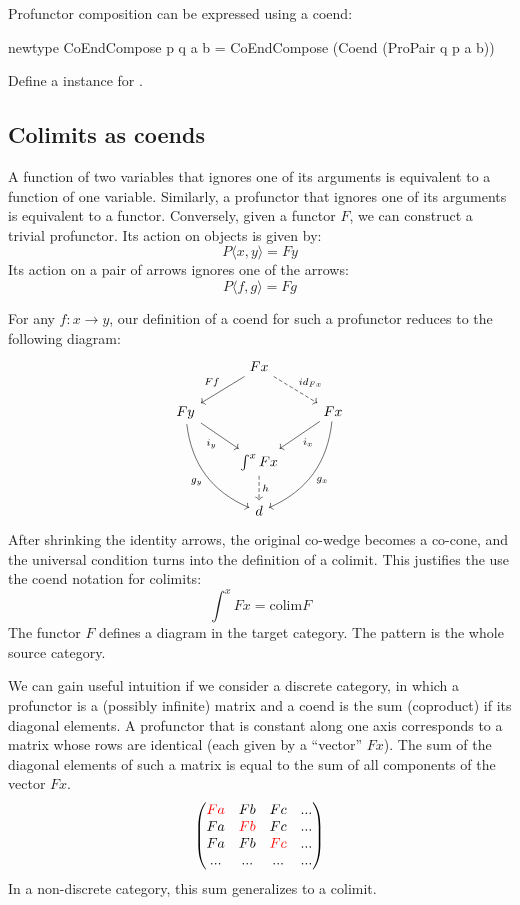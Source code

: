 \documentclass[DaoFP]{subfiles}
\begin{document}
\begin{exercise}
Profunctor composition can be expressed using a coend:
\begin{haskell}
newtype CoEndCompose p q a b = CoEndCompose (Coend (ProPair q p a b))
\end{haskell}
Define a  instance for .
\end{exercise}

\subsection{Colimits as coends}
A function of two variables that ignores one of its arguments is equivalent to a function of one variable. Similarly, a profunctor that ignores one of its arguments is equivalent to a functor. Conversely, given a functor $F$, we can construct a trivial profunctor. Its action on objects is given by:
\[P \langle x, y \rangle = F y \]
Its action on a pair of arrows ignores one of the arrows:
\[P \langle f, g \rangle = F g \]

For any   $f \colon x \to y$, our definition of a coend for such a profunctor reduces to the following diagram:
\[
 \begin{tikzcd}
 & F x
 \arrow[ld, "F f"']
 \arrow[rd, dashed, "id_{F x}"]
 \\
 F y
 \arrow[dr, "i_y"']
 \arrow[ddr, bend right,  "g_y"']
 && F x
 \arrow[dl, "i_x"]
 \arrow[ddl, bend left,  "g_x"]
 \\
 &\int^x F x
 \arrow[d, dashed, "h"]
 \\
 &d
 \end{tikzcd}
\]
After shrinking the identity arrows, the original co-wedge becomes a co-cone, and the universal condition turns into the definition of a colimit. This justifies the use the coend notation for colimits:
\[ \int^x F x = \text{colim} F \]
The functor $F$ defines a diagram in the target category. The pattern is the whole source category.

We can gain useful intuition if we consider a discrete category, in which a profunctor is a (possibly infinite) matrix and a coend is the sum (coproduct) if its diagonal elements. A profunctor that is constant along one axis corresponds to a matrix whose rows are identical (each given by a ``vector'' $F x$). The sum of the diagonal elements of such a matrix is equal to the sum of all components of the vector $F x$.
\[
\begin{pmatrix}
\color{red} F a & F b & F c & ... \\
F a & \color{red}F b & F c & ...\\
F a & F b &\color{red}F c & ...\\
... & ... & ... & ...
\end{pmatrix}
\]
In a non-discrete category, this sum generalizes to a colimit.
\end{document}
